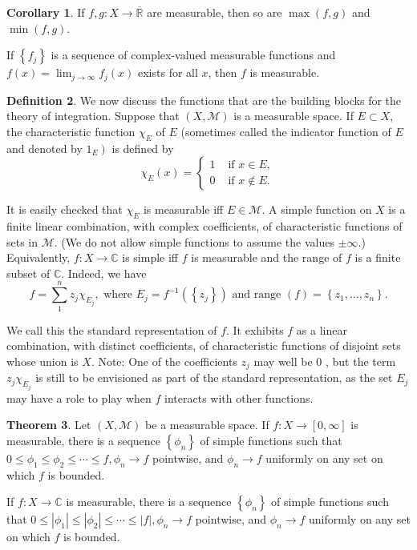 \documentclass[12pt,a4paper]{book}
\theoremstyle{definition}
\newtheorem{defn}{Definition}[section]
\newtheorem{coro}[defn]{Corollary}
\newtheorem{theo}[defn]{Theorem}
\begin{document}
\begin{coro}
    If $f, g: X \rightarrow \overline{\mathbb{R}}$ are measurable, then so are $\max (f, g)$ and $\min (f, g)$.

    If $\left\{f_j\right\}$ is a sequence of complex-valued measurable functions and $f(x)=\lim _{j \rightarrow \infty} f_j(x)$ exists for all $x$, then $f$ is measurable.
\end{coro}
\begin{defn}
    We now discuss the functions that are the building blocks for the theory of integration. Suppose that $(X, \mathcal{M})$ is a measurable space. If $E \subset X$, the characteristic function $\chi_E$ of $E$ (sometimes called the indicator function of $E$ and denoted by $\left.1_E\right)$ is defined by
    $$
        \chi_E(x)= \begin{cases}1 & \text { if } x \in E, \\ 0 & \text { if } x \notin E .\end{cases}
    $$

    It is easily checked that $\chi_E$ is measurable iff $E \in \mathcal{M}$. A simple function on $X$ is a finite linear combination, with complex coefficients, of characteristic functions of sets in $\mathcal{M}$. (We do not allow simple functions to assume the values $\pm \infty$.) Equivalently, $f: X \rightarrow \mathbb{C}$ is simple iff $f$ is measurable and the range of $f$ is a finite subset of $\mathbb{C}$. Indeed, we have
    $$
        f=\sum_1^n z_j \chi_{E_j}, \text { where } E_j=f^{-1}\left(\left\{z_j\right\}\right) \text { and range }(f)=\left\{z_1, \ldots, z_n\right\} .
    $$

    We call this the standard representation of $f$. It exhibits $f$ as a linear combination, with distinct coefficients, of characteristic functions of disjoint sets whose union is $X$. Note: One of the coefficients $z_j$ may well be 0 , but the term $z_j \chi_{E_j}$ is still to be envisioned as part of the standard representation, as the set $E_j$ may have a role to play when $f$ interacts with other functions.
\end{defn}
\begin{theo}
    Let $(X, \mathcal{M})$ be a measurable space.
    If $f: X \rightarrow[0, \infty]$ is measurable, there is a sequence $\left\{\phi_n\right\}$ of simple functions such that $0 \leq \phi_1 \leq \phi_2 \leq \cdots \leq f, \phi_n \rightarrow f$ pointwise, and $\phi_n \rightarrow f$ uniformly on any set on which $f$ is bounded.

    If $f: X \rightarrow \mathbb{C}$ is measurable, there is a sequence $\left\{\phi_n\right\}$ of simple functions such that $0 \leq\left|\phi_1\right| \leq\left|\phi_2\right| \leq \cdots \leq|f|, \phi_n \rightarrow f$ pointwise, and $\phi_n \rightarrow f$ uniformly on any set on which $f$ is bounded.

    \label{theorem:approximate by simple function}

\end{theo}
\end{document}
